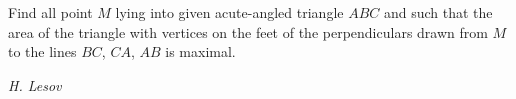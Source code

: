 Find all point $M$ lying into given acute-angled triangle $ABC$ and such that the area of the triangle with vertices on the feet of the perpendiculars drawn from $M$ to the lines $BC$, $CA$, $AB$ is maximal.

\textit{H. Lesov}